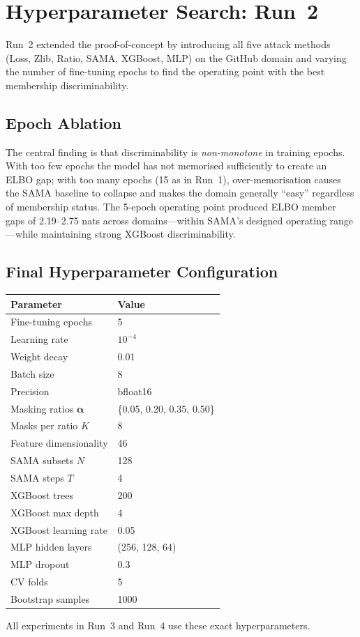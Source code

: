 \section{Hyperparameter Search: Run~2}
\label{app:hyperparam}

Run~2 extended the proof-of-concept by introducing all five attack methods
(Loss, Zlib, Ratio, SAMA, XGBoost, MLP) on the GitHub domain and varying the
number of fine-tuning epochs to find the operating point with the best
membership discriminability.

\subsection*{Epoch Ablation}

The central finding is that discriminability is \emph{non-monotone} in training
epochs.  With too few epochs the model has not memorised sufficiently to create
an ELBO gap; with too many epochs (15 as in Run~1), over-memorisation causes
the SAMA baseline to collapse and makes the domain generally ``easy'' regardless
of membership status.  The 5-epoch operating point produced ELBO member gaps
of 2.19--2.75 nats across domains—within SAMA's designed operating range—while
maintaining strong XGBoost discriminability.

\subsection*{Final Hyperparameter Configuration}

\begin{center}
\small
\begin{tabular}{ll}
\toprule
\textbf{Parameter} & \textbf{Value} \\
\midrule
Fine-tuning epochs         & 5 \\
Learning rate              & $10^{-4}$ \\
Weight decay               & 0.01 \\
Batch size                 & 8 \\
Precision                  & bfloat16 \\
Masking ratios $\boldsymbol\alpha$ & \{0.05, 0.20, 0.35, 0.50\} \\
Masks per ratio $K$        & 8 \\
Feature dimensionality     & 46 \\
SAMA subsets $N$           & 128 \\
SAMA steps $T$             & 4 \\
XGBoost trees              & 200 \\
XGBoost max depth          & 4 \\
XGBoost learning rate      & 0.05 \\
MLP hidden layers          & (256, 128, 64) \\
MLP dropout                & 0.3 \\
CV folds                   & 5 \\
Bootstrap samples          & 1000 \\
\bottomrule
\end{tabular}
\end{center}

All experiments in Run~3 and Run~4 use these exact hyperparameters.
